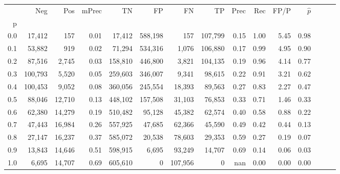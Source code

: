 \begin{tabular}{rrrrrrrrrrrrrrr}
\toprule
{} &      Neg &     Pos & mPrec &       TN &       FP &       FN &       TP &  Prec &   Rec &  FP/P & $\hat{p}$ \\
p   &          &         &       &          &          &          &          &       &       &       &           \\
\midrule
0.0 &   17,412 &     157 &  0.01 &   17,412 &  588,198 &      157 &  107,799 &  0.15 &  1.00 &  5.45 &      0.98 \\
0.1 &   53,882 &     919 &  0.02 &   71,294 &  534,316 &    1,076 &  106,880 &  0.17 &  0.99 &  4.95 &      0.90 \\
0.2 &   87,516 &   2,745 &  0.03 &  158,810 &  446,800 &    3,821 &  104,135 &  0.19 &  0.96 &  4.14 &      0.77 \\
0.3 &  100,793 &   5,520 &  0.05 &  259,603 &  346,007 &    9,341 &   98,615 &  0.22 &  0.91 &  3.21 &      0.62 \\
0.4 &  100,453 &   9,052 &  0.08 &  360,056 &  245,554 &   18,393 &   89,563 &  0.27 &  0.83 &  2.27 &      0.47 \\
0.5 &   88,046 &  12,710 &  0.13 &  448,102 &  157,508 &   31,103 &   76,853 &  0.33 &  0.71 &  1.46 &      0.33 \\
0.6 &   62,380 &  14,279 &  0.19 &  510,482 &   95,128 &   45,382 &   62,574 &  0.40 &  0.58 &  0.88 &      0.22 \\
0.7 &   47,443 &  16,984 &  0.26 &  557,925 &   47,685 &   62,366 &   45,590 &  0.49 &  0.42 &  0.44 &      0.13 \\
0.8 &   27,147 &  16,237 &  0.37 &  585,072 &   20,538 &   78,603 &   29,353 &  0.59 &  0.27 &  0.19 &      0.07 \\
0.9 &   13,843 &  14,646 &  0.51 &  598,915 &    6,695 &   93,249 &   14,707 &  0.69 &  0.14 &  0.06 &      0.03 \\
1.0 &    6,695 &  14,707 &  0.69 &  605,610 &        0 &  107,956 &        0 &   nan &  0.00 &  0.00 &      0.00 \\
\bottomrule
\end{tabular}
